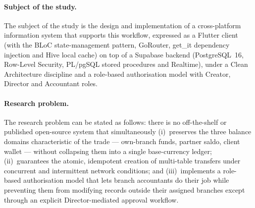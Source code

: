 \paragraph{Subject of the study.}
The subject of the study is the design and implementation of a cross-platform information system that supports this workflow, expressed as a Flutter client (with the BLoC state-management pattern, GoRouter, get\_it dependency injection and Hive local cache) on top of a Supabase backend (PostgreSQL~16, Row-Level Security, PL/pgSQL stored procedures and Realtime), under a Clean Architecture discipline and a role-based authorisation model with Creator, Director and Accountant roles.

\paragraph{Research problem.}
The research problem can be stated as follows: there is no off-the-shelf or published open-source system that simultaneously (i)~preserves the three balance domains characteristic of the trade --- own-branch funds, partner saldo, client wallet --- without collapsing them into a single base-currency ledger; (ii)~guarantees the atomic, idempotent creation of multi-table transfers under concurrent and intermittent network conditions; and (iii)~implements a role-based authorisation model that lets branch accountants do their job while preventing them from modifying records outside their assigned branches except through an explicit Director-mediated approval workflow.


